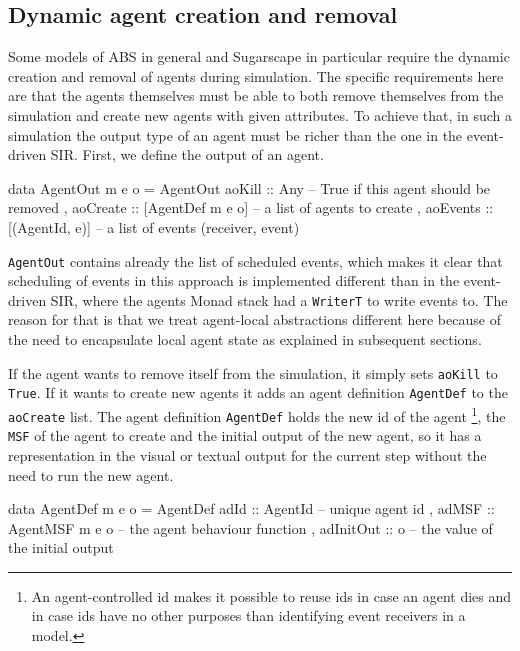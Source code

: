 \subsection{Dynamic agent creation and removal}
\label{sec:dynamic_creationremoval}
Some models of ABS in general and Sugarscape in particular require the dynamic creation and removal of agents during simulation. The specific requirements here are that the agents themselves must be able to both remove themselves from the simulation and create new agents with given attributes. To achieve that, in such a simulation the output type of an agent must be richer than the one in the event-driven SIR. First, we define the output of an agent.

\begin{HaskellCode}
data AgentOut m e o = AgentOut
  { aoKill   :: Any              -- True if this agent should be removed 
  , aoCreate :: [AgentDef m e o] -- a list of agents to create
  , aoEvents :: [(AgentId, e)]   -- a list of events (receiver, event)
  }
\end{HaskellCode}

\texttt{AgentOut} contains already the list of scheduled events, which makes it clear that scheduling of events in this approach is implemented different than in the event-driven SIR, where the agents Monad stack had a \texttt{WriterT} to write events to. The reason for that is that we treat agent-local abstractions different here because of the need to encapsulate local agent state as explained in subsequent sections.

If the agent wants to remove itself from the simulation, it simply sets \texttt{aoKill} to \texttt{True}. If it wants to create new agents it adds an agent definition \texttt{AgentDef} to the \texttt{aoCreate} list. The agent definition \texttt{AgentDef} holds the new id of the agent \footnote{An agent-controlled id makes it possible to reuse ids in case an agent dies and in case ids have no other purposes than identifying event receivers in a model.}, the \texttt{MSF} of the agent to create and the initial output of the new agent, so it has a representation in the visual or textual output for the current step without the need to run the new agent.

\begin{HaskellCode}
data AgentDef m e o = AgentDef
  { adId      :: AgentId         -- unique agent id
  , adMSF     :: AgentMSF m e o  -- the agent behaviour function
  , adInitOut :: o               -- the value of the initial output
  }
\end{HaskellCode}

